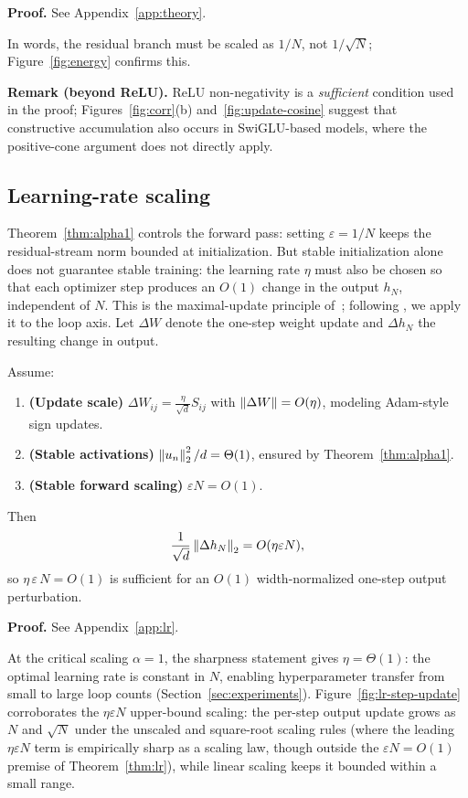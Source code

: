 \noindent\textbf{Proof.} See Appendix~\ref{app:theory}.

In words, the residual branch must be scaled as $1/N$, not $1/\!\sqrt{N}$; Figure~\ref{fig:energy} confirms this.

\smallskip
\noindent\textbf{Remark (beyond ReLU).}\enspace
ReLU non-negativity is a \emph{sufficient} condition used in the proof; Figures~\ref{fig:corr}(b) and~\ref{fig:update-cosine} suggest that constructive accumulation also occurs in SwiGLU-based models, where the positive-cone argument does not directly apply.

\subsection{Learning-rate scaling}

Theorem~\ref{thm:alpha1} controls the forward pass: setting $\varepsilon=1/N$ keeps the residual-stream norm bounded at initialization.
But stable initialization alone does not guarantee stable training: the learning rate $\eta$ must also be chosen so that each optimizer step produces an $O(1)$ change in the output $h_N$, independent of $N$.
This is the maximal-update principle of~\citet{yang2022tensorprogramsV}; following \citet{dey2025completep}, we apply it to the loop axis.
Let $\Delta W$ denote the one-step weight update and $\Delta h_N$ the resulting change in output.

\begin{theorem}
  \label{thm:lr}
  Assume:
  \begin{enumerate}
    \item \textbf{(Update scale)}
      $\Delta W_{ij}=\frac{\eta}{\sqrt d}S_{ij}$ with $\left\lVert \Delta W \right\rVert=O(\eta)$, modeling Adam-style sign updates.
    \item \textbf{(Stable activations)}
      $\left\lVert u_n \right\rVert_2^2/d=\Theta(1)$, ensured by Theorem~\ref{thm:alpha1}.
    \item \textbf{(Stable forward scaling)}
      $\varepsilon N=O(1)$.
  \end{enumerate}
  Then
  \[
    \frac{1}{\sqrt d}\left\lVert \Delta h_N \right\rVert_2
    =
    O(\eta\varepsilon N),
  \]
  so $\eta\,\varepsilon\,N=O(1)$ is sufficient for an $O(1)$ width-normalized one-step output perturbation.
\end{theorem}

\noindent\textbf{Proof.} See Appendix~\ref{app:lr}.

\smallskip

At the critical scaling $\alpha=1$, the sharpness statement gives $\eta=\Theta(1)$: the optimal learning rate is constant in $N$, enabling hyperparameter transfer from small to large loop counts (Section~\ref{sec:experiments}).
Figure~\ref{fig:lr-step-update} corroborates the $\eta\varepsilon N$ upper-bound scaling: the per-step output update grows as $N$ and $\sqrt{N}$ under the unscaled and square-root scaling rules (where the leading $\eta\varepsilon N$ term is empirically sharp as a scaling law, though outside the $\varepsilon N{=}O(1)$ premise of Theorem~\ref{thm:lr}), while linear scaling keeps it bounded within a small range.


